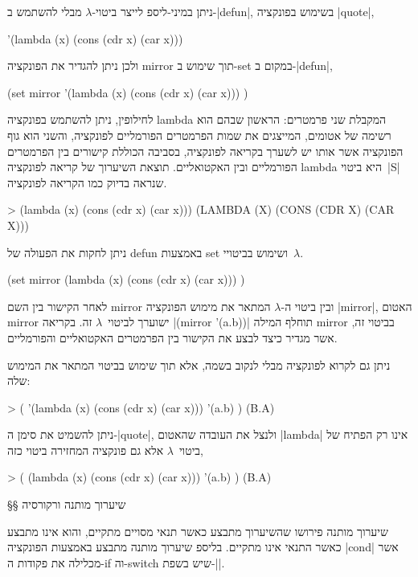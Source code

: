 ניתן במיני-ליספ לייצר ביטוי-$λ$ מבלי להשתמש ב-\E|defun|, בשימוש בפונקציה
\E|quote|,
\begin{LISP}
  '(lambda (x) (cons (cdr x) (car x)))
\end{LISP}
ולכן ניתן להגדיר את הפונקציה mirror תוך שימוש ב-set במקום ב-\E|defun|,
\begin{LISP}
(set mirror
  '(lambda (x)
      (cons (cdr x) (car x)))
)
\end{LISP}
לחילופין, ניתן להשתמש בפונקציה lambda המקבלת שני פרמטרים: הראשון שבהם הוא רשימה
של אטומים, המייצגים את שמות הפרמטרים הפורמליים לפונקציה, והשני הוא גוף הפונקציה
אשר אותו יש לשערך בקריאה לפונקציה, בסביבה הכוללת קישורים בין הפרמטרים הפורמליים
ובין האקטואליים. תוצאת השיערוך של קריאה לפונקציה lambda היא ביטוי~\E|S| שנראה
בדיוק כמו הקריאה לפונקציה.
\begin{LISP}
> (lambda (x) (cons (cdr x) (car x)))
(LAMBDA (X) (CONS (CDR X) (CAR X)))
\end{LISP}
ניתן לחקות את הפעולה של defun באמצעות set ושימוש בביטויי~$λ$.
\begin{LISP}
(set
  mirror
  (lambda (x) (cons (cdr x) (car x)))
)
\end{LISP}
לאחר הקישור בין השם mirror ובין ביטוי ה-$λ$ המתאר את מימוש הפונקציה \E|mirror|,
האטום mirror ישוערך לביטוי~$λ$ זה. בקריאה \T|(mirror '(a.b))| תוחלף המילה
mirror בביטוי זה, אשר מגדיר כיצד לבצע את הקישור בין הפרמטרים האקטואליים
והפורמליים.

ניתן גם לקרוא לפונקציה מבלי לנקוב בשמה, אלא תוך שימוש בביטוי המתאר את המימוש
שלה:
\pagebreak[3]
\begin{LISP}
> (
    '(lambda (x)
      (cons (cdr x) (car x)))
    '(a.b)
)
(B.A)
\end{LISP}
ניתן להשמיט את סימן ה-\E|quote|, ולנצל את העובדה שהאטום \T|lambda| אינו רק
הפתיח של ביטוי~$λ$ אלא גם פונקציה המחזירה ביטוי כזה,
\begin{LISP}
> (
    (lambda (x) (cons (cdr x) (car x)))
    '(a.b)
)
(B.A)
\end{LISP}

§§ שיערוך מותנה ורקורסיה

שיערוך מותנה פירושו שהשיערוך מתבצע כאשר תנאי מסויים מתקיים, והוא אינו מתבצע
כאשר התנאי אינו מתקיים. בליספ שיערוך מותנה מתבצע באמצעות הפונקציה \E|cond|
אשר מכלילה את פקודות ה-if וה-switch שיש בשפת-\E|\CPL|.

